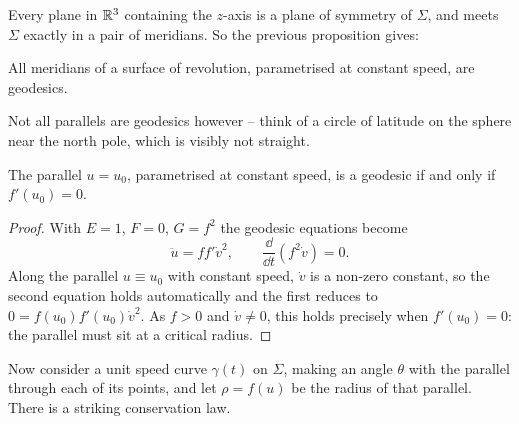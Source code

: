 \documentclass[a4paper]{scrartcl}
\begin{document}
Every plane in $\mathbb{R}^3$ containing the $z$-axis is a plane of symmetry of $\Sigma$, and meets $\Sigma$ exactly in a pair of meridians. So the previous proposition gives:

\begin{corollary}
    All meridians of a surface of revolution, parametrised at constant speed, are geodesics.
\end{corollary}

Not all parallels are geodesics however -- think of a circle of latitude on the sphere near the north pole, which is visibly not straight.

\begin{lemma}
    The parallel $u = u_0$, parametrised at constant speed, is a geodesic if and only if $f'(u_0) = 0$.
\end{lemma}
\begin{proof}
    With $E = 1$, $F = 0$, $G = f^2$ the geodesic equations become
    $$
    \ddot u = f f' \dot v^2, \qquad \frac{\dd}{\dd t}\left(f^2\dot v\right) = 0.
    $$
    Along the parallel $u \equiv u_0$ with constant speed, $\dot v$ is a non-zero constant, so the second equation holds automatically and the first reduces to $0 = f(u_0)f'(u_0)\dot v^2$. As $f > 0$ and $\dot v \neq 0$, this holds precisely when $f'(u_0) = 0$: the parallel must sit at a critical radius.
\end{proof}

Now consider a unit speed curve $\gamma(t)$ on $\Sigma$, making an angle $\theta$ with the parallel through each of its points, and let $\rho = f(u)$ be the radius of that parallel. There is a striking conservation law.

\begin{center}
\end{center}
\end{document}
